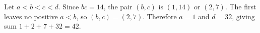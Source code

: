 Let $a<b<c<d$. Since $bc=14$, the pair $(b,c)$ is $(1,14)$ or $(2,7)$. The first leaves no positive $a<b$, so $(b,c)=(2,7)$. Therefore $a=1$ and $d=32$, giving sum $1+2+7+32=\boxed{42}$.
